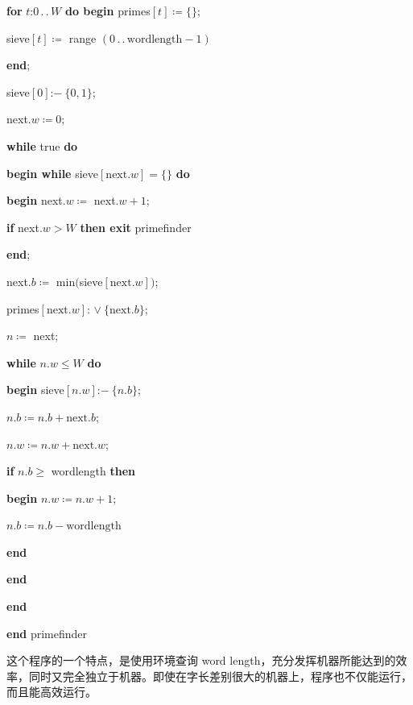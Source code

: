 \documentclass[twoside,11pt,fontset=none]{ctexbook}
\begin{document}
\quad \quad \textbf{for} $t$:$0\,.\,.\,W$ \textbf{do begin} primes$[t] \coloneq \{\}$;

\quad \quad \quad sieve$[t] \coloneq$ range $(0\,.\,.\, \text{wordlength} - 1)$

\quad \quad \textbf{end};

\quad \quad sieve$[0]$:$-\ \{0, 1\}$;

\quad \quad next.$w\coloneq 0$;

\quad \quad \textbf{while} true \textbf{do}

\quad \quad \quad \textbf{begin while} sieve$[\text{next}.w] = \{\}$ \textbf{do}

\quad \quad \quad \quad \textbf{begin} next.$w\coloneq$ next.$w + 1$;

\quad \quad \quad \quad \quad \textbf{if} next.$w > W$ \textbf{then exit} primefinder

\quad \quad \quad \quad \textbf{end};

\quad \quad \quad \quad next.$b\coloneq$ min$($sieve$[\text{next}.w])$;

\quad \quad \quad \quad primes$[\text{next}.w]$: $\vee\ \{\text{next}.b\}$;

\quad \quad \quad \quad $n\coloneq$ next;

\quad \quad \quad \quad \textbf{while} $n.w \leqslant W$ \textbf{do}

\quad \quad \quad \quad \quad \textbf{begin} sieve$[n.w]$:$-\ \{n.b\}$;

\quad \quad \quad \quad \quad \quad $n.b\coloneq n.b + \text{next}.b$;

\quad \quad \quad \quad \quad \quad $n.w\coloneq n. w + \text{next}.w$;

\quad \quad \quad \quad \quad \quad \textbf{if} $n.b \geqslant$ wordlength \textbf{then}

\quad \quad \quad \quad \quad \quad \textbf{begin} $n.w\coloneq n.w + 1$;

\quad \quad \quad \quad \quad \quad \quad $n.b\coloneq n.b - \text{wordlength}$

\quad \quad \quad \quad \quad \quad \textbf{end}

\quad \quad \quad \quad \quad \textbf{end}

\quad \quad \quad \textbf{end}

\quad \textbf{end} primefinder

这个程序的一个特点，是使用环境查询 word length，充分发挥机器所能达到的效率，同时又完全独立于机器。即使在字长差别很大的机器上，程序也不仅能运行，而且能高效运行。
\end{document}
